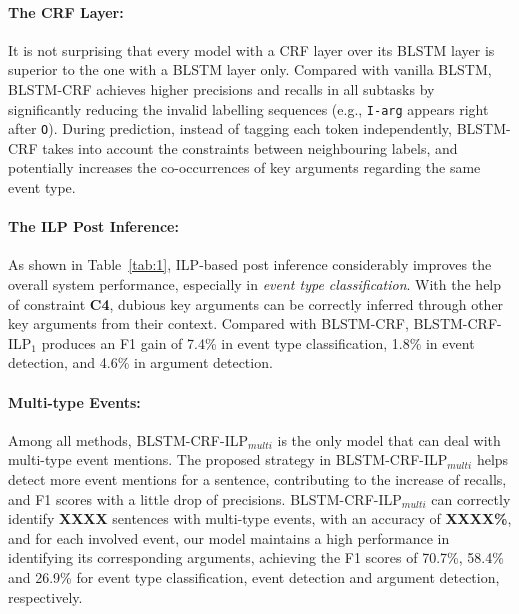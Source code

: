 
\paragraph{The CRF Layer:} 
It is not surprising that  every model with a CRF layer over its BLSTM layer is superior to the one with a BLSTM layer only. Compared with vanilla BLSTM, BLSTM-CRF achieves higher precisions and recalls in all subtasks by significantly reducing the invalid labelling sequences (e.g., \texttt{I-arg} appears right after \texttt{O}). During prediction, instead of tagging each token independently, BLSTM-CRF takes into account the constraints between neighbouring labels, and potentially increases the co-occurrences of key arguments regarding the same event type. %

\paragraph{The ILP Post Inference:} 
As shown in Table~\ref{tab:1}, ILP-based post inference considerably improves the overall system performance, especially in \textit{event type classification}. With the help of constraint \textbf{C4},  dubious key arguments can be correctly inferred through other key arguments from their context. Compared with BLSTM-CRF, BLSTM-CRF-ILP$_1$ produces an F1 gain of 7.4\% in event type classification, 1.8\% in event detection, and 4.6\% in argument detection. %

\paragraph{Multi-type Events:}
Among all methods, BLSTM-CRF-ILP$_{multi}$ is the only model that can deal with multi-type event mentions. %
The proposed strategy in BLSTM-CRF-ILP$_{multi}$ helps detect more event mentions for a sentence, contributing to the increase of recalls, and F1 scores with a little drop of precisions. 
BLSTM-CRF-ILP$_{multi}$ can correctly identify \textbf{XXXX} sentences with multi-type events, 
with an accuracy of \textbf{XXXX\%}, and for each involved event, our model maintains a high 
performance in identifying its corresponding arguments, achieving the F1 scores of 70.7\%, 58.4\% 
and 26.9\% for   event type classification, event detection and argument detection, respectively. 

